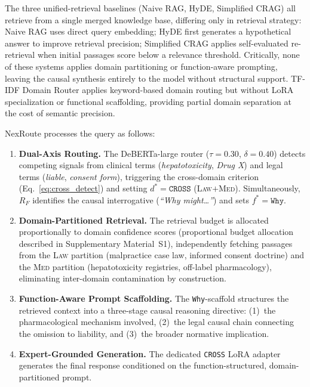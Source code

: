 \documentclass[a4paper,fleql]{cas-sc}
\begin{document}
The three unified-retrieval baselines (Naive RAG, HyDE, Simplified CRAG) all retrieve
from a single merged knowledge base, differing only in retrieval strategy:
Naive RAG uses direct query embedding; HyDE first generates a hypothetical
answer to improve retrieval precision; Simplified CRAG applies self-evaluated re-retrieval
when initial passages score below a relevance threshold. Critically, none of
these systems applies domain partitioning or function-aware prompting,
leaving the causal synthesis entirely to the model without structural support.
TF-IDF Domain Router applies keyword-based domain routing but without LoRA
specialization or functional scaffolding, providing partial domain separation
at the cost of semantic precision.

NexRoute processes the query as follows:
\begin{enumerate}
    \item \textbf{Dual-Axis Routing.} The DeBERTa-large router
    ($\tau{=}0.30$, $\delta{=}0.40$) detects competing signals from clinical
    terms (\textit{hepatotoxicity}, \textit{Drug X}) and legal terms
    (\textit{liable}, \textit{consent form}), triggering the cross-domain
    criterion (Eq.~\ref{eq:cross_detect}) and setting $d^* = \texttt{CROSS}$
    (\textsc{Law}$+$\textsc{Med}). Simultaneously, $R_F$ identifies the causal
    interrogative (\textit{``Why might\ldots''}) and sets
    $f^* = \texttt{Why}$.

    \item \textbf{Domain-Partitioned Retrieval.} The retrieval budget is
    allocated proportionally to domain confidence scores
    (proportional budget allocation described in Supplementary Material~S1),
    independently fetching passages from the
    \textsc{Law} partition (malpractice case law, informed consent doctrine)
    and the \textsc{Med} partition (hepatotoxicity registries, off-label
    pharmacology), eliminating inter-domain contamination by construction.

    \item \textbf{Function-Aware Prompt Scaffolding.} The \texttt{Why}-scaffold
    structures the retrieved context into a three-stage causal reasoning
    directive: (1)~the pharmacological mechanism involved, (2)~the legal causal
    chain connecting the omission to liability, and (3)~the broader normative
    implication.

    \item \textbf{Expert-Grounded Generation.} The dedicated \texttt{CROSS}
    LoRA adapter generates the final response conditioned on the
    function-structured, domain-partitioned prompt.
\end{enumerate}
\end{document}
